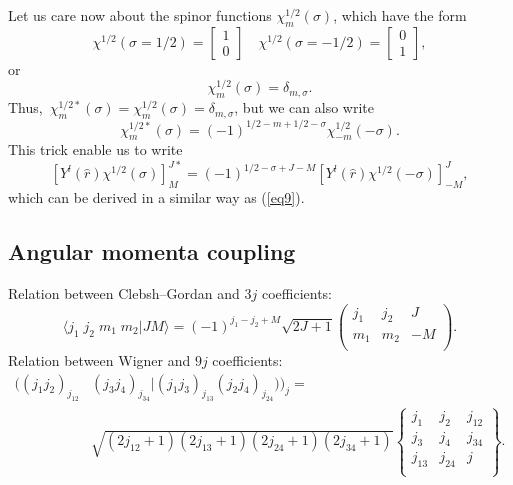 \begin{subappendices}
Let us care now about the spinor functions $\chi^{1/2}_m(\sigma)$, which have the form
\begin{equation}\label{eq10}
\chi^{1/2}(\sigma=1/2)=\left[ \begin{aligned} 1\\0 \end{aligned}\right]  \quad
\chi^{1/2}(\sigma=-1/2)=\left[ \begin{aligned} 0\\1 \end{aligned}\right],
\end{equation}
or
\begin{equation}\label{eq11}
\chi^{1/2}_m(\sigma)=\delta_{m,\sigma}.
\end{equation}
Thus, $\, \chi^{1/2*}_m(\sigma)=\chi^{1/2}_m(\sigma)=\delta_{m,\sigma}$, but we can also write
\begin{equation}\label{eq12}
\chi^{1/2*}_m(\sigma)=(-1)^{1/2-m+1/2-\sigma}\chi^{1/2}_{-m}(-\sigma).
\end{equation}
This trick enable us to write
\begin{equation}\label{eq13}
\left[ Y^{l}(\hat r)\chi^{1/2}(\sigma)\right]^{J*}_{M}=(-1)^{1/2-\sigma+J-M}
\left[ Y^{l}(\hat r)\chi^{1/2}(-\sigma)\right]^{J}_{-M},
\end{equation}
which can be derived in a similar way as (\ref{eq9}).

\subsection{Angular momenta coupling}
Relation between Clebsh--Gordan and $3j$ coefficients:
\begin{equation}\label{eq204}
\langle j_1\; j_2 \; m_1\;m_2 | J M\rangle=(-1)^{j_1-j_2+M}\sqrt{2J+1}\begin{pmatrix}
  j_1&j_2&J\\
 m_1&m_2&-M\\
\end{pmatrix}.
\end{equation}
Relation between Wigner and $9j$ coefficients:
\begin{equation}\label{eq205}
\begin{split}
\bigl ( (j_1j_2)_{j_{12}}& (j_3j_4)_{j_{34}} |(j_1j_3)_{j_{13}} (j_2j_4)_{j_{24}}) \bigr )_j=\\
&\sqrt{(2j_{12}+1)(2j_{13}+1)(2j_{24}+1)(2j_{34}+1)}\begin{Bmatrix}
  j_1&j_2&j_{12}\\
 j_3&j_4&j_{34}\\
 j_{13}&j_{24}&j\\
\end{Bmatrix}.
\end{split}
\end{equation}

\end{subappendices}
